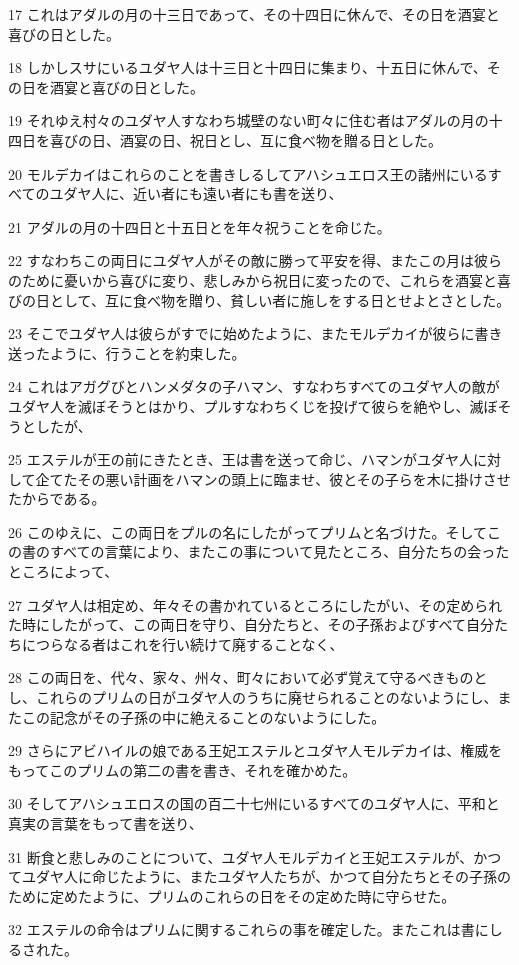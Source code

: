 \par 17 これはアダルの月の十三日であって、その十四日に休んで、その日を酒宴と喜びの日とした。
\par 18 しかしスサにいるユダヤ人は十三日と十四日に集まり、十五日に休んで、その日を酒宴と喜びの日とした。
\par 19 それゆえ村々のユダヤ人すなわち城壁のない町々に住む者はアダルの月の十四日を喜びの日、酒宴の日、祝日とし、互に食べ物を贈る日とした。
\par 20 モルデカイはこれらのことを書きしるしてアハシュエロス王の諸州にいるすべてのユダヤ人に、近い者にも遠い者にも書を送り、
\par 21 アダルの月の十四日と十五日とを年々祝うことを命じた。
\par 22 すなわちこの両日にユダヤ人がその敵に勝って平安を得、またこの月は彼らのために憂いから喜びに変り、悲しみから祝日に変ったので、これらを酒宴と喜びの日として、互に食べ物を贈り、貧しい者に施しをする日とせよとさとした。
\par 23 そこでユダヤ人は彼らがすでに始めたように、またモルデカイが彼らに書き送ったように、行うことを約束した。
\par 24 これはアガグびとハンメダタの子ハマン、すなわちすべてのユダヤ人の敵がユダヤ人を滅ぼそうとはかり、プルすなわちくじを投げて彼らを絶やし、滅ぼそうとしたが、
\par 25 エステルが王の前にきたとき、王は書を送って命じ、ハマンがユダヤ人に対して企てたその悪い計画をハマンの頭上に臨ませ、彼とその子らを木に掛けさせたからである。
\par 26 このゆえに、この両日をプルの名にしたがってプリムと名づけた。そしてこの書のすべての言葉により、またこの事について見たところ、自分たちの会ったところによって、
\par 27 ユダヤ人は相定め、年々その書かれているところにしたがい、その定められた時にしたがって、この両日を守り、自分たちと、その子孫およびすべて自分たちにつらなる者はこれを行い続けて廃することなく、
\par 28 この両日を、代々、家々、州々、町々において必ず覚えて守るべきものとし、これらのプリムの日がユダヤ人のうちに廃せられることのないようにし、またこの記念がその子孫の中に絶えることのないようにした。
\par 29 さらにアビハイルの娘である王妃エステルとユダヤ人モルデカイは、権威をもってこのプリムの第二の書を書き、それを確かめた。
\par 30 そしてアハシュエロスの国の百二十七州にいるすべてのユダヤ人に、平和と真実の言葉をもって書を送り、
\par 31 断食と悲しみのことについて、ユダヤ人モルデカイと王妃エステルが、かつてユダヤ人に命じたように、またユダヤ人たちが、かつて自分たちとその子孫のために定めたように、プリムのこれらの日をその定めた時に守らせた。
\par 32 エステルの命令はプリムに関するこれらの事を確定した。またこれは書にしるされた。

